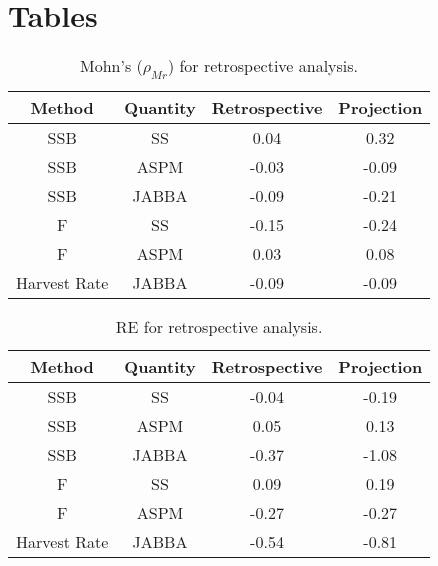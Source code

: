 \section{Tables}

\begin{table}[!ht]
\caption{Mohn's ($\rho_{Mr}$) for retrospective analysis.}  
\begin{center}
\label{tab:retro-rho}
\begin{tabular}{|cccc|}
\hline
	\tiny Method	& {\tiny Quantity}  & {\tiny Retrospective} & {\tiny Projection} \\ 
\hline\hline
{\tiny SSB          } & {\tiny SS} 	     & {\tiny    0.04} & {\tiny  0.32}      \\
{\tiny SSB          } & {\tiny ASPM} 	 & {\tiny   -0.03} & {\tiny -0.09}      \\
{\tiny SSB          } & {\tiny JABBA} 	 & {\tiny   -0.09} & {\tiny -0.21}      \\
{\tiny F            } & {\tiny SS} 	     & {\tiny   -0.15} & {\tiny -0.24}      \\
{\tiny F            } & {\tiny ASPM} 	 & {\tiny    0.03} & {\tiny  0.08}      \\
{\tiny Harvest Rate } & {\tiny JABBA} 	 & {\tiny   -0.09} & {\tiny -0.09}      \\
\hline
\end{tabular}
\end{center}
\end{table}

\begin{table}[!ht]
\caption{RE for retrospective analysis.}  
\begin{center}
\label{tab:retro-re}
\begin{tabular}{|cccc|}
\hline
	\tiny Method	& {\tiny Quantity}  & {\tiny Retrospective} & {\tiny Projection} \\ 
\hline\hline
{\tiny SSB          } & {\tiny SS}    & {\tiny -0.04} & {\tiny  -0.19}      \\
{\tiny SSB          } & {\tiny ASPM}  & {\tiny  0.05} & {\tiny   0.13}      \\
{\tiny SSB          } & {\tiny JABBA} & {\tiny -0.37} & {\tiny  -1.08}      \\
{\tiny F            } & {\tiny SS} 	  & {\tiny  0.09} & {\tiny   0.19}      \\
{\tiny F            } & {\tiny ASPM}  & {\tiny -0.27} & {\tiny  -0.27}      \\
{\tiny Harvest Rate } & {\tiny JABBA} & {\tiny -0.54} & {\tiny  -0.81}      \\
\hline
\end{tabular}
\end{center}
\end{table}

